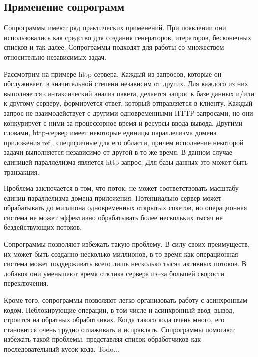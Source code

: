 	\subsection{Применение сопрограмм}
	Сопрограммы имеют ряд практических применений. При появлении они использовались как средство
	для создания генераторов, итераторов, бесконечных списков и так далее. Сопрограммы подходят для работы со
	множеством относительно независимых задач.
	\par
	Рассмотрим на примере http-сервера. Каждый из запросов, которые он обслуживает, в значительной степени
	независим от других. Для каждого из них выполняется синтаксический анализ пакета, делается запрос к базе данных и/или к другому серверу, формируется ответ, который отправляется в клиенту. 
	Каждый запрос не взаимодействует с другими одновременными HTTP-запросами, но они конкурирует с ними за
	процессорное время и ресурсы ввода-вывода.
	Другими словами, http-сервер имеет некоторые единицы параллелизма домена приложения[ref], специфичные для его
	области, причем исполнение некоторой задачи выполняется независимо от другой в то же время.
	В данном случае единицей параллелизма является http-запрос. Для базы данных это может быть транзакция.
	\par
	Проблема заключается в том, что поток, не может соответствовать масштабу единиц параллелизма домена приложения.
	Потенциально сервер может обрабатывать до миллиона
	одновременных открытых сокетов, но операционная система не может эффективно обрабатывать более нескольких
	тысяч не бездействующих потоков.
	\par
	Сопрограммы позволяют избежать такую проблему. В силу своих преимуществ, их может быть
	созданно несколько миллионов, в то время как операционная система может поддерживать всего 
	лишь несколько тысяч активных потоков. В добавок они уменьшают время отклика сервера из--за
	большей скорости переключения.
	\par
	Кроме того, сопрограммы позволяют легко организовать работу с асинхронным кодом.
	Неблокирующие операции, в том числе и асинхронный ввод--вывод, строится на обратных обработчиках.
	Когда такого кода очень много, его становится очень трудно отлаживать и исправлять. Сопрограммы 
	помогают избежать такой проблемы, представляя список обработчиков как последовательный кусок кода.
	Todo...
	
\clearpage